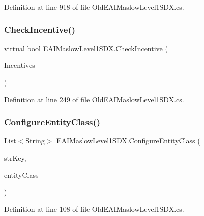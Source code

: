 Definition at line 918 of file Old\+E\+A\+I\+Maslow\+Level1\+S\+D\+X.\+cs.

\mbox{\label{class_e_a_i_maslow_level1_s_d_x_ae3ac80dc384be929dead884d125248c2}} 
\subsubsection{\texorpdfstring{CheckIncentive()}{CheckIncentive()}}
{\footnotesize\ttfamily virtual bool E\+A\+I\+Maslow\+Level1\+S\+D\+X.\+Check\+Incentive (\begin{DoxyParamCaption}\item[{List$<$ String $>$}]{Incentives }\end{DoxyParamCaption})\hspace{0.3cm}{\ttfamily [virtual]}}



Definition at line 249 of file Old\+E\+A\+I\+Maslow\+Level1\+S\+D\+X.\+cs.

\mbox{\label{class_e_a_i_maslow_level1_s_d_x_abb700bd226558cd1bc8d138f9390af2d}} 
\subsubsection{\texorpdfstring{ConfigureEntityClass()}{ConfigureEntityClass()}}
{\footnotesize\ttfamily List$<$String$>$ E\+A\+I\+Maslow\+Level1\+S\+D\+X.\+Configure\+Entity\+Class (\begin{DoxyParamCaption}\item[{String}]{str\+Key,  }\item[{Entity\+Class}]{entity\+Class }\end{DoxyParamCaption})}



Definition at line 108 of file Old\+E\+A\+I\+Maslow\+Level1\+S\+D\+X.\+cs.

\mbox{\label{class_e_a_i_maslow_level1_s_d_x_a420a147329a60a28393005ccc0efdb15}} 
